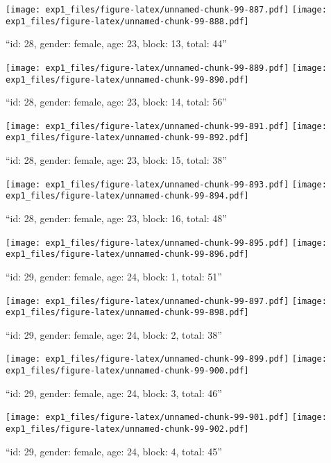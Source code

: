 \documentclass[,]{article}
\begin{document}
\texttt{[image: exp1\_files/figure-latex/unnamed-chunk-99-887.pdf]}
\texttt{[image: exp1\_files/figure-latex/unnamed-chunk-99-888.pdf]}

\newpage
[1] 

``id: 28, gender: female, age: 23, block: 13, total: 44''

\texttt{[image: exp1\_files/figure-latex/unnamed-chunk-99-889.pdf]}
\texttt{[image: exp1\_files/figure-latex/unnamed-chunk-99-890.pdf]}

\newpage
[1] 

``id: 28, gender: female, age: 23, block: 14, total: 56''

\texttt{[image: exp1\_files/figure-latex/unnamed-chunk-99-891.pdf]}
\texttt{[image: exp1\_files/figure-latex/unnamed-chunk-99-892.pdf]}

\newpage
[1] 

``id: 28, gender: female, age: 23, block: 15, total: 38''

\texttt{[image: exp1\_files/figure-latex/unnamed-chunk-99-893.pdf]}
\texttt{[image: exp1\_files/figure-latex/unnamed-chunk-99-894.pdf]}

\newpage
[1] 

``id: 28, gender: female, age: 23, block: 16, total: 48''

\texttt{[image: exp1\_files/figure-latex/unnamed-chunk-99-895.pdf]}
\texttt{[image: exp1\_files/figure-latex/unnamed-chunk-99-896.pdf]}

\newpage
[1] 

``id: 29, gender: female, age: 24, block: 1, total: 51''

\texttt{[image: exp1\_files/figure-latex/unnamed-chunk-99-897.pdf]}
\texttt{[image: exp1\_files/figure-latex/unnamed-chunk-99-898.pdf]}

\newpage
[1] 

``id: 29, gender: female, age: 24, block: 2, total: 38''

\texttt{[image: exp1\_files/figure-latex/unnamed-chunk-99-899.pdf]}
\texttt{[image: exp1\_files/figure-latex/unnamed-chunk-99-900.pdf]}

\newpage
[1] 

``id: 29, gender: female, age: 24, block: 3, total: 46''

\texttt{[image: exp1\_files/figure-latex/unnamed-chunk-99-901.pdf]}
\texttt{[image: exp1\_files/figure-latex/unnamed-chunk-99-902.pdf]}

\newpage
[1] 

``id: 29, gender: female, age: 24, block: 4, total: 45''
\end{document}
